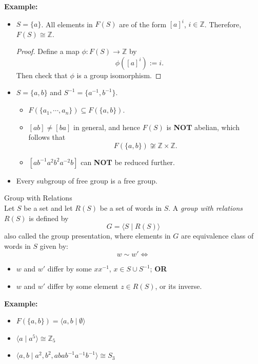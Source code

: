 \noindent\textbf{Example:}
\begin{itemize}
    \item $S = \{ a\}$. All elements in $F(S)$ are of the form $[a]^i$, $i \in \mathbb{Z}$. Therefore, $F(S) \cong \mathbb{Z}$.
    \begin{proof}
        Define a map $\phi : F(S) \rightarrow \mathbb{Z}$ by
        $$\phi ([a]^{i}) := i.$$
        Then check that $\phi$ is a group isomorphism.
    \end{proof}
    \item $S = \{a,b\}$ and $S^{-1} = \{ a^{-1},b^{-1} \}$.
    \begin{itemize}
        \item $F(\{ a_1,\cdots,a_n \}) \subseteq F(\{a,b\})$.
        \item $[ab] \neq [ba]$ in general, and hence $F(S)$ is \textbf{NOT} abelian, which follows that
        $$F(\{ a,b\} ) \not\cong \mathbb{Z} \times \mathbb{Z}.$$
        \item $[ab^{-1}a^2b^2a^{-2}b]$ can \textbf{NOT} be reduced further.
    \end{itemize}
    \item Every subgroup of free group is a free group.
\end{itemize}

\begin{definition}{Group with Relations}\\
Let $S$ be a set and let $R(S)$ be a set of words in $S$. A \textit{group with relations $R(S)$} is defined by
$$G = \langle S \mid R(S) \rangle$$
also called the group presentation, where elements in $G$ are equivalence class of words in $S$ given by:
$$w \sim w' \Leftrightarrow $$
\begin{itemize}
    \item $w$ and $w'$ differ by some $xx^{-1}$, $x \in S \cup S^{-1}$; \textbf{OR}
    \item $w$ and $w'$ differ by some element $z \in R(S)$, or its inverse.
\end{itemize}
\end{definition}

\noindent\textbf{Example:}
\begin{itemize}
    \item $F(\{a,b\}) = \langle a,b \mid \emptyset \rangle$
    \item $\langle a \mid a^5 \rangle \cong \mathbb{Z}_5$
    \item $\langle a,b \mid a^2,b^2,abab^{-1}a^{-1}b^{-1} \rangle \cong S_3$
\end{itemize}

